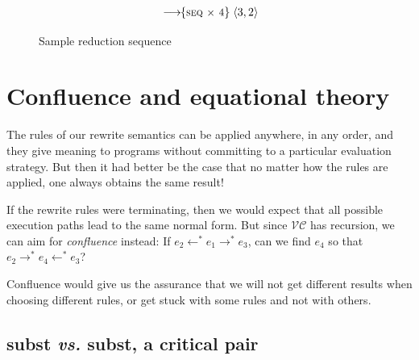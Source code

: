 \documentclass[acmsmall,review,dvipsnames]{acmart}
\newcommand{\vs}{\emph{vs.}}
\newcommand{\versecalc}{$\mathcal{VC}$}
\newcommand{\rulename}[1]{\textsc{\small #1}}
\newcommand{\movesto}{\longrightarrow}
\newcommand{\movesfrom}{\longleftarrow}
\newcommand{\movestoC}[1]{\movesto\!\!\{#1\}}
\newcommand{\movestoR}[1]{\movestoC{\rulename{#1}}}
\begin{document}
\begin{figure}
\begin{scriptsize}
$$\begin{array}{@{}l@{\;}l@{\;}l@{}}
               & \movestoR{seq $\times$ 4} & \ensuremath{\langle{}\mathrm{3},\mathrm{2}\rangle} \\
\end{array}
$$
\end{scriptsize}
\caption{Sample reduction sequence} \label{fig:sample-reductions}
\end{figure}

\section{Confluence and equational theory}
\label{sec:confluence}

The rules of our rewrite semantics can be applied anywhere, in any order, and they give meaning to programs without committing to a particular evaluation strategy. But then it had better be the case that no matter how the rules are applied, one always obtains the same result!

If the rewrite rules were terminating, then we would expect that all possible execution paths lead to the same normal form. But since {\versecalc} has recursion, we can aim for \emph{confluence} instead: If $e_2 \movesfrom^\ast e_1 \movesto^\ast e_3$, can we find $e_4$ so that $e_2 \movesto^\ast e_4 \movesfrom^\ast e_3$?

Confluence would give us the assurance that we will not get different results when choosing different rules, or get stuck with some rules and not with others.

\subsection{subst {\vs} subst, a critical pair}
\end{document}
